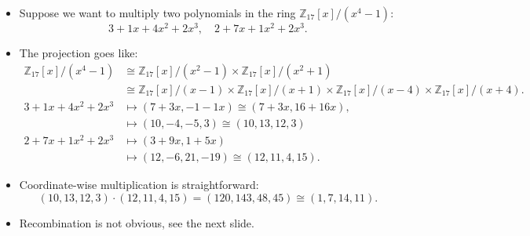 \begin{frame}
    \begin{itemize}
        \item Suppose we want to multiply two polynomials in the ring \( \mathbb{Z}_{17}[x]/(x^{4}-1) \):
            \[
                3 + 1x + 4x^{2} + 2x^{3},\quad 2 + 7x + 1x^{2} + 2x^{3}.
            \]
        \item The projection goes like:
            \begin{align*}
                \mathbb{Z}_{17}[x]/(x^{4}-1) 
                &\cong 
                \mathbb{Z}_{17}[x]/(x^{2}-1) \times 
                \mathbb{Z}_{17}[x]/(x^{2}+1)\\
                &\cong 
                \mathbb{Z}_{17}[x]/(x-1) \times 
                \mathbb{Z}_{17}[x]/(x+1) \times 
                \mathbb{Z}_{17}[x]/(x-4) \times 
                \mathbb{Z}_{17}[x]/(x+4).\\
                3 + 1x + 4x^{2} + 2x^{3} 
                &\mapsto 
                (7 + 3x, -1 - 1x) \cong (7 + 3x, 16 + 16x),\\
                &\mapsto 
                (10, -4, -5, 3 ) \cong (10, 13, 12, 3)\\
                2 + 7x + 1x^{2} + 2x^{3} 
                &\mapsto 
                (3 + 9x, 1 + 5x)\\
                &\mapsto 
                (12, -6, 21, -19 ) \cong (12, 11, 4, 15).
            \end{align*}
        \item Coordinate-wise multiplication is straightforward:
            \[
                (10, 13, 12, 3) \cdot (12, 11, 4, 15) = (120, 143, 48, 45)
                \cong (1, 7, 14, 11).
            \]
        \item Recombination is not obvious, see the next slide.
    \end{itemize}
\end{frame}


